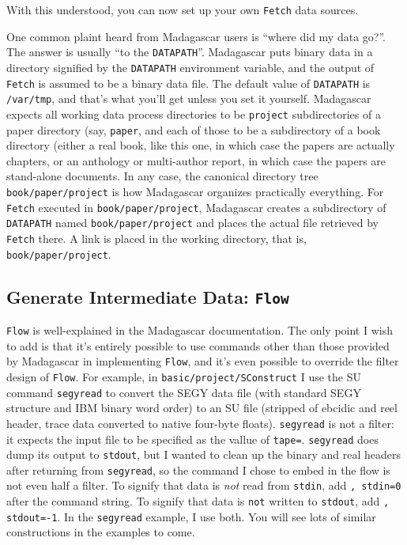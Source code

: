With this understood, you can now set up your own {\tt Fetch} data sources.

One common plaint heard from Madagascar users is ``where did my data go?''. The answer is usually ``to the {\tt DATAPATH}''. Madagascar puts binary data in a directory signified by the {\tt DATAPATH} environment variable, and the output of {\tt Fetch} is assumed to be a binary data file. The default value of {\tt DATAPATH} is {\tt /var/tmp}, and that's what you'll get unless you set it yourself. Madagascar expects all working data process directories to be {\tt project} subdirectories of a paper directory (say, {\tt paper}, and each of those to be a subdirectory of a book directory (either a real book, like this one, in which case the papers are actually chapters, or an anthology or multi-author report, in which case the papers are stand-alone documents. In any case, the canonical directory tree {\tt book/paper/project} is how Madagascar organizes practically everything. For {\tt Fetch} executed in {\tt book/paper/project}, Madagascar creates a subdirectory of {\tt DATAPATH} named {\tt book/paper/project} and places the actual file retrieved by {\tt Fetch} there. A link is placed in the working directory, that is, {\tt book/paper/project}. 

\subsection{Generate Intermediate Data: {\tt Flow}}
{\tt Flow} is well-explained in the Madagascar documentation. The only point I wish to add is that it's entirely possible to use commands other than those provided by Madagascar in implementing {\tt Flow}, and it's even possible to override the filter design of {\tt Flow}. For example, in {\tt basic/project/SConstruct}  I use the SU command {\tt segyread} to convert the SEGY data file (with standard SEGY structure and IBM binary word order) to an SU file (stripped of ebcidic and reel header, trace data converted to native four-byte floats). {\tt segyread} is not a filter: it expects the input file to be specified as the vallue of {\tt tape=}. {\tt segyread} does dump its output to {\tt stdout}, but I wanted to clean up the binary and real headers after returning from {\tt segyread}, so the command I chose to embed in the flow is not even half a filter. To signify that data is {\em not} read from {\tt stdin}, add {\tt, stdin=0} after the command string. To signify that data is {\tt not} written to {\tt stdout}, add {\tt, stdout=-1}. In the {\tt segyread} example, I use both. You will see lots of similar constructions in the examples to come.

